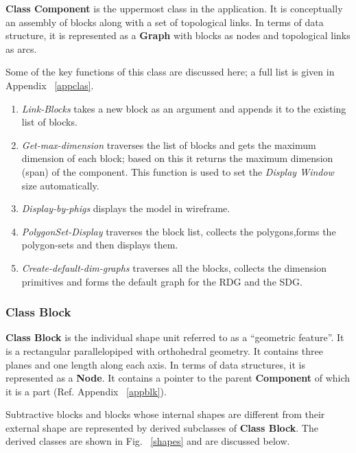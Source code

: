 		{\bf Class Component} is the uppermost class in the application. It is 
		conceptually an assembly of blocks along with a set of topological 
		links. In terms 
		of data structure, it is represented as a {\bf Graph} with blocks as
		nodes and topological links as arcs. 
		
		Some of the key functions of this class are discussed here; a full list
		is given in Appendix ~\ref{appclas}.

			\begin{enumerate}
			\item
			{\em Link-Blocks} takes a new block as an argument and appends it
			to the existing list of blocks.
			\item
			{\em Get-max-dimension} traverses the list of blocks and gets
			the maximum dimension of each block; based on this it
			returns the maximum dimension (span) of the component. This function
			is used to set the {\em Display Window} size automatically.
			\item
			{\em Display-by-phigs} displays the model in wireframe.
			\item
			{\em PolygonSet-Display} traverses the block list, collects the
			polygons,forms the polygon-sets and then displays them.
			\item
			{\em Create-default-dim-graphs} traverses all the blocks, collects
			the dimension primitives and forms the default graph
			for the RDG and the SDG.
			\end{enumerate}

		\subsubsection{Class Block}

		{\bf Class Block} is the individual shape unit referred to as
		a ``geometric feature''. It is a rectangular parallelopiped with
		orthohedral geometry. It contains three planes and one length
		along each axis. In terms of data structures, it is represented as
		a {\bf Node}. It contains a pointer to the parent {\bf Component} of 
		which it is a part (Ref. Appendix ~\ref{appblk}).

		Subtractive blocks and blocks whose internal shapes are different
		from their external shape are represented by derived subclasses of
		{\bf Class Block}. The derived classes are shown in
		Fig. ~\ref{shapes} and are discussed below.


